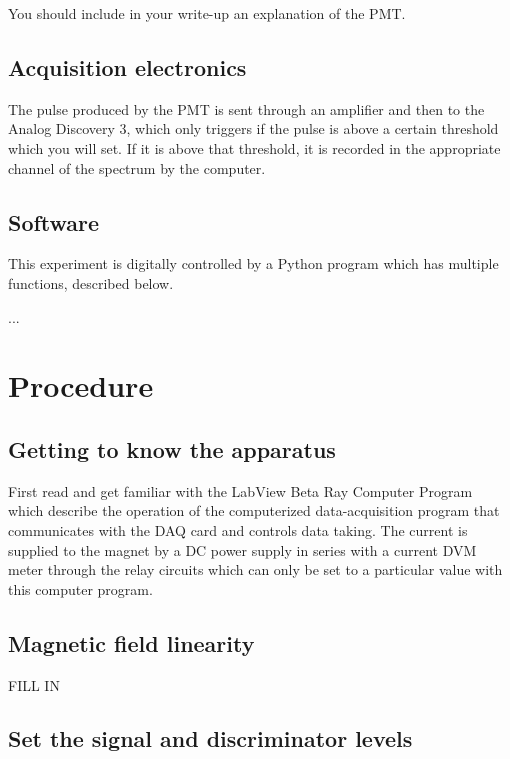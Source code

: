 \documentclass{../lab}
\begin{document}
You should include in your write-up an explanation of the PMT.%

\subsection{Acquisition electronics}

The pulse produced by the PMT is sent through an amplifier and then to the Analog Discovery 3, which only triggers if the pulse is above a certain threshold which you will set. If it is above that threshold, it is recorded in the appropriate channel of the spectrum by the computer.

\subsection{Software}

This experiment is digitally controlled by a Python program which has multiple functions, described below.


...

\section{Procedure}

\subsection{Getting to know the apparatus}

First read and get familiar with the LabView Beta Ray Computer Program  \cite{Siegbahn} which describe the operation of the computerized data-acquisition program that communicates with the DAQ card and controls data taking. The current is supplied to the magnet by a DC power supply in series with a current DVM meter through the relay circuits which can only be set to a particular value with this computer program.


\subsection{Magnetic field linearity}

FILL IN

\subsection{Set the signal and discriminator levels}
\end{document}
